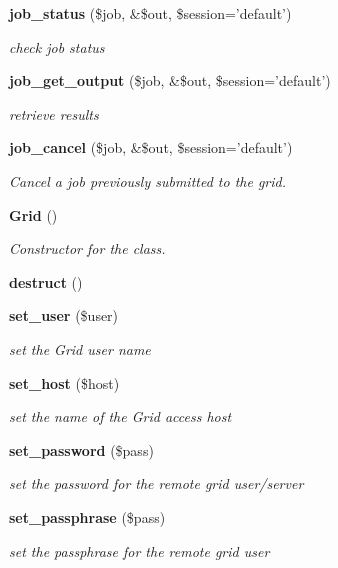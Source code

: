 \begin{CompactItemize}
{\bf job\_\-status} (\$job, \&\$out, \$session='default')
\begin{CompactList}\small\item\em check job status \item\end{CompactList}\item 
{\bf job\_\-get\_\-output} (\$job, \&\$out, \$session='default')
\begin{CompactList}\small\item\em retrieve results \item\end{CompactList}\item 
{\bf job\_\-cancel} (\$job, \&\$out, \$session='default')
\begin{CompactList}\small\item\em Cancel a job previously submitted to the grid. \item\end{CompactList}\item 
{\bf Grid} ()
\begin{CompactList}\small\item\em Constructor for the class. \item\end{CompactList}\item 
{\bf destruct} ()
\item 
{\bf set\_\-user} (\$user)
\begin{CompactList}\small\item\em set the Grid user name \item\end{CompactList}\item 
{\bf set\_\-host} (\$host)
\begin{CompactList}\small\item\em set the name of the Grid access host \item\end{CompactList}\item 
{\bf set\_\-password} (\$pass)
\begin{CompactList}\small\item\em set the password for the remote grid user/server \item\end{CompactList}\item 
{\bf set\_\-passphrase} (\$pass)
\begin{CompactList}\small\item\em set the passphrase for the remote grid user \item\end{CompactList}\item 

\end{CompactItemize}
